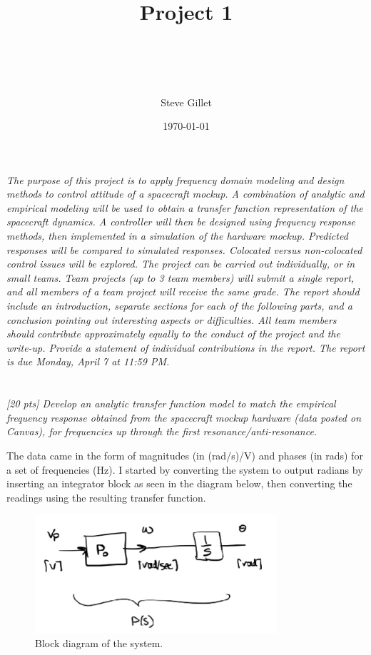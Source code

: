 \documentclass{article}
\title{Project 1 \\ \className \\ \professorName \\ \taName}
\author{Steve Gillet}
\date{\today}
\begin{document}
\maketitle

\textit{The purpose of this project is to apply frequency domain modeling and design methods to control attitude of a spacecraft mockup. A combination of analytic and empirical modeling will be used to obtain a transfer function representation of the spacecraft dynamics. A controller will then be designed using frequency response methods, then implemented in a simulation of the hardware mockup. Predicted responses will be compared to simulated responses. Colocated versus non-colocated control issues will be explored.
The project can be carried out individually, or in small teams. Team projects (up to 3 team members) will submit a single report, and all members of a team project will receive the same grade. The report should include an introduction, separate sections for each of the following parts, and a conclusion pointing out interesting aspects or difficulties. All team members should contribute approximately equally to the conduct of the project and the write-up. Provide a statement of individual contributions in the report. The report is due Monday, April 7 at 11:59 PM.}

\section{}

\textit{[20 pts] Develop an analytic transfer function model to match the empirical frequency response obtained from the spacecraft mockup hardware (data posted on Canvas), for frequencies up through the first resonance/anti-resonance.}

The data came in the form of magnitudes (in (rad/s)/V) and phases (in rads) for a set of frequencies (Hz).
I started by converting the system to output radians by inserting an integrator block as seen in the diagram below, then converting the readings using the resulting transfer function.

\begin{figure}[H]
    \centering
    \includegraphics[width=0.8\textwidth]{dataIntegrationDiagram.png}
    \caption{Block diagram of the system.}
    \label{fig:dataIntegrationDiagram}
\end{figure}
\end{document}
